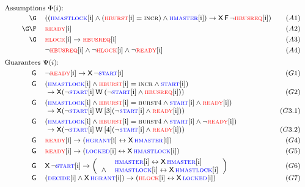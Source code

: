 \[
{
\footnotesize
\begin{array}{llrlr}
\multicolumn{4}{l}{\text{Assumptions $\Phi(i)$:}} \\[2pt]
& & \G & ((\hmastlocki \land (\hbursti = \hincr) \land \hmasteri) \rightarrow \nextt \eventually \neg \hbusreqi) & (A1) \\[3pt]
& & \G\F & \hreadyi & (A2) \\[3pt]
& & \G & \hlocki \rightarrow \hbusreqi & (A3) \\[3pt]
& & & \neg \hbusreqi \land \neg \hlocki \land \neg \hreadyi & (A4) \\[5pt]

\multicolumn{4}{l}{\text{Guarantees $\Psi(i)$:}} \\[3pt]
& & \always & \neg \hreadyi \rightarrow \nextt \neg \hstarti & (G1) \\[3pt]
& & \always & (\hmastlocki \land \hbursti = \hincr \land \hstarti)\\
& & & ~\rightarrow \nextt (\neg \hstarti \weakuntil (\neg \hstarti \land \hbusreqi)) & (G2) \\[3pt]
& & \always & (\hmastlocki \land \hbursti = \hburstfour \land \hstarti \land \hreadyi)\\
& & & ~\rightarrow \nextt (\neg \hstarti \weakuntil[3] (\neg \hstarti \land \hreadyi)) & (G3.1) \\[3pt]
& & \always & (\hmastlocki \land \hbursti = \hburstfour \land \hstarti \land \neg \hreadyi)\\
& & & ~\rightarrow \nextt (\neg \hstarti \weakuntil[4] (\neg \hstarti \land \hreadyi)) & (G3.2) \\[3pt]
& & \always & \hreadyi \rightarrow (\hgranti \leftrightarrow \nextt \hmasteri) & (G4)\\[3pt]
& & \always & \hreadyi \rightarrow (\hlockedi \leftrightarrow \nextt \hmastlocki) & (G5)\\[3pt]
& & \always & \nextt \neg \hstarti \impl \left(
\begin{array}{ll}
 & \hmasteri \leftrightarrow \nextt \hmasteri\\
\land & \hmastlocki \leftrightarrow \nextt \hmastlocki
\end{array}
 \right) & (G6)\\[3pt]
& & \always & (\hdecidei \land \nextt \hgranti) \rightarrow (\hlocki \leftrightarrow \nextt \hlockedi) & (G7)\\[3pt]


\end{array}}\]
